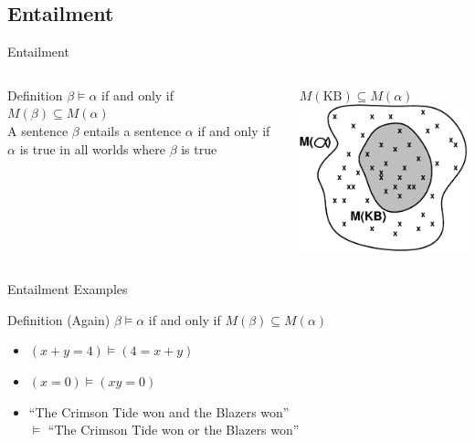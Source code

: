 \documentclass[14pt]{beamer}
\begin{document}
\subsection{Entailment}
\begin{frame}{Entailment}
\begin{columns}
\begin{column}{0.45\textwidth}
\begin{block}{Definition}
$\beta \models \alpha$ if and only if \\
\hspace{1em} $M(\beta) \subseteq M(\alpha)$\\[1em]
A sentence $\beta$ entails a sentence $\alpha$ if and only if $\alpha$ is true in all worlds where $\beta$ is true
\end{block}
\end{column}
\begin{column}{0.45\textwidth}
\begin{block}{$M(\mbox{KB}) \subseteq M(\alpha)$}
\includegraphics[width=2in]{model-inclusion}
\end{block}
\end{column}
\end{columns}
\end{frame}

\begin{frame}{Entailment Examples}
\begin{block}{Definition (Again)}
$\beta \models \alpha$ if and only if $M(\beta) \subseteq M(\alpha)$
\end{block}
\pause
\begin{itemize}[<+->]
\item $(x + y = 4) \models (4 = x + y)$
\item $(x = 0) \models (xy = 0)$
\item ``The Crimson Tide won and the Blazers won'' \\
\hspace{1em} $\models$ ``The Crimson Tide won or the Blazers won''
\end{itemize}
\end{frame}
\end{document}
